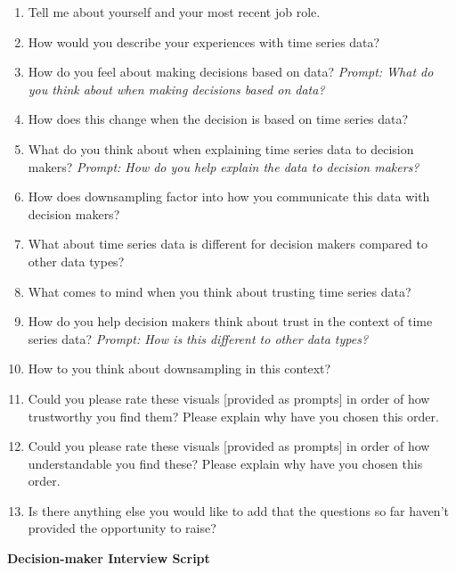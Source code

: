 \documentclass[
]{article}
\begin{document}
\begin{enumerate}
\def\labelenumi{\arabic{enumi}.}
\item
  Tell me about yourself and your most recent job role.
\item
  How would you describe your experiences with time series data?
\item
  How do you feel about making decisions based on data? \emph{Prompt:
  What do you think about when making decisions based on data?}
\item
  How does this change when the decision is based on time series data?
\item
  What do you think about when explaining time series data to decision
  makers? \emph{Prompt: How do you help explain the data to decision
  makers?}
\item
  How does downsampling factor into how you communicate this data with
  decision makers?
\item
  What about time series data is different for decision makers compared
  to other data types?
\item
  What comes to mind when you think about trusting time series data?
\item
  How do you help decision makers think about trust in the context of
  time series data? \emph{Prompt: How is this different to other data
  types?}
\item
  How to you think about downsampling in this context?
\item
  Could you please rate these visuals {[}provided as prompts{]} in order
  of how trustworthy you find them? Please explain why have you chosen
  this order.
\item
  Could you please rate these visuals {[}provided as prompts{]} in order
  of how understandable you find these? Please explain why have you
  chosen this order.
\item
  Is there anything else you would like to add that the questions so far
  haven't provided the opportunity to raise?
\end{enumerate}

\textbf{Decision-maker Interview Script}
\end{document}
